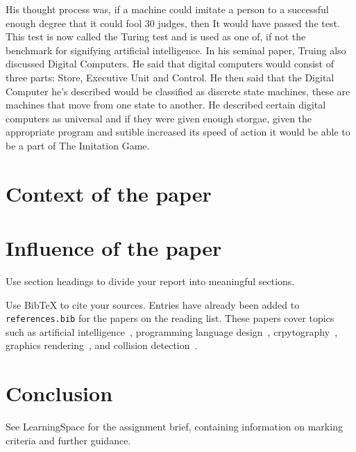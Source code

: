 \documentclass{article}
\begin{document}
His thought process was, if a machine could imitate a person to a successful enough degree that it could fool 30%
judges, then It would have passed the test. This test is now called the Turing test and is used as one of, if not the 
benchmark for signifying artificial intelligence. In his seminal paper, Truing also discussed Digital Computers. He 
said that digital computers would consist of three parts: Store, Executive Unit and Control. He then said that the 
Digital Computer he’s described would be classified as discrete state machines, these are machines that move from one 
state to another. He described certain digital computers as universal and if they were given enough storgae, given the 
appropriate program and sutible increased its speed of action it would be able to be a part of The Imitation Game.

\section{Context of the paper}

\section{Influence of the paper}

Use section headings to divide your report into meaningful sections.

Use BibTeX to cite your sources. Entries have already been added to \texttt{references.bib} for the papers on the reading list.
These papers cover topics such as artificial intelligence~\cite{turing1950_intelligence, knuth1975_alphabeta}, programming language design~\cite{dijkstra1968_goto}, crpytography~\cite{rivest1978_rsa}, graphics rendering~\cite{phong1975_illumination}, and collision detection~\cite{gilbert1988_gjk}.

\section{Conclusion}

See LearningSpace for the assignment brief, containing information on marking criteria and further guidance.











\end{document}
